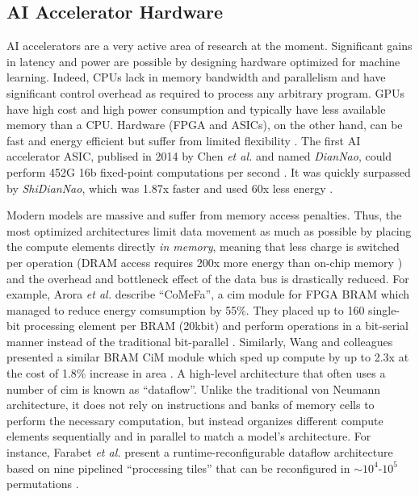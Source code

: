 \subsection{AI Accelerator Hardware}
AI accelerators are a very active area of research at the moment. Significant gains in latency and power are possible by designing hardware optimized for machine learning. Indeed, CPUs
lack in memory bandwidth and parallelism and have significant control overhead as required to process any arbitrary program. GPUs have high cost and high power consumption and typically have
less available memory than a CPU. Hardware (FPGA and ASICs), on the other hand, can be fast and energy efficient but suffer from limited flexibility \cite{hu2022survey}. The first AI accelerator
ASIC, publised in 2014 by Chen \textit{et al.} and named \textit{DianNao}, could perform 452G 16b fixed-point computations per second \cite{chen2014diannao}. It was quickly surpassed by
\textit{ShiDianNao}, which was 1.87x faster and used 60x less energy \cite{du2015shidiannao}.

Modern models are massive and suffer from memory access penalties. Thus, the most optimized architectures limit data movement as much as possible by placing the compute elements directly
\textit{in memory}, meaning that less charge is switched per operation (DRAM access requires 200x more energy than on-chip memory \cite*{ding2017circnn}) and the overhead and bottleneck effect
of the data bus is drastically reduced. For example, Arora \textit{et al.} describe ``CoMeFa'', a \ac{cim} module for FPGA BRAM which managed to reduce energy comsumption by 55\%. They placed up
to 160 single-bit processing element per BRAM (20kbit) and perform operations in a bit-serial manner instead of the traditional bit-parallel \cite*{arora2022comefa}. Similarly, Wang and colleagues
presented a similar BRAM CiM module which sped up compute by up to 2.3x at the cost of 1.8\% increase in area \cite*{wang2021compute}. A high-level architecture that often uses a number of \ac{cim}
is known as ``dataflow''. Unlike the traditional von Neumann architecture, it does not rely on instructions and banks of memory cells to perform the necessary computation, but instead organizes
different compute elements sequentially and in parallel to match a model's architecture. For instance, Farabet \textit{et al.} present a runtime-reconfigurable dataflow architecture based on nine 
pipelined ``processing tiles'' that can be reconfigured in $\sim$$10^4$-$10^5$ permutations \cite{farabetlargescale}.

